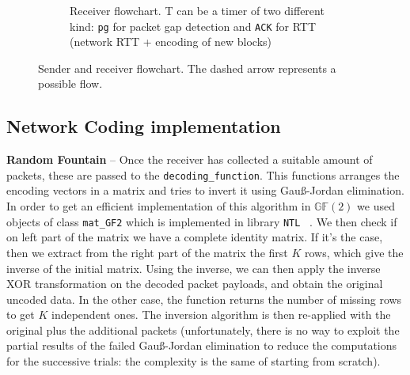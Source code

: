 \begin{sidewaysfigure}
\begin{subfigure}{0.5\hsize}
	\caption{Receiver flowchart. T can be a timer of two different kind: \texttt{pg} for packet gap detection and \texttt{ACK} for RTT (network RTT + encoding of new blocks)}
	\label{fig:receiver}

\end{subfigure}

\caption{Sender and receiver flowchart. The dashed arrow represents a possible flow.}
\label{fig:flowchart}
\end{sidewaysfigure}

\subsection{Network Coding implementation}
\textbf{Random Fountain} -- Once the receiver has collected a suitable amount of packets, these are passed to the \texttt{decoding\_function}. This functions arranges the encoding vectors in a matrix and tries to invert it using Gau{\ss}-Jordan elimination. In order to get an efficient implementation of this algorithm in $\mathds{G}\mathds{F}(2)$ we used objects of class \texttt{mat\_GF2} which is implemented in library \texttt{NTL} ~\cite{NTL}. We then check if on left part of the matrix we have a complete identity matrix. If it's the case, then we extract from the right part of the matrix the first $K$ rows, which give the inverse of the initial matrix. Using the inverse, we can then apply the inverse XOR transformation on the decoded packet payloads, and obtain the original uncoded data. In the other case, the function returns the number of missing rows to get $K$ independent ones. The inversion algorithm is then re-applied with the original plus the additional packets (unfortunately, there is no way to exploit the partial results of the failed Gau{\ss}-Jordan elimination to reduce the computations for the successive trials: the complexity is the same of starting from scratch).

